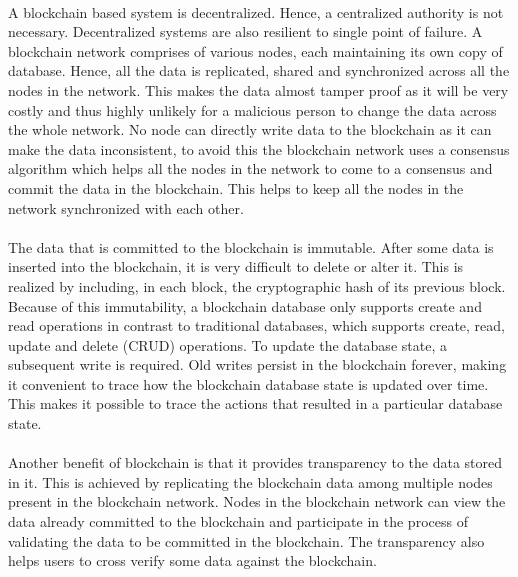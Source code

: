 \documentclass[12pt]{article}
\begin{document}
        \paragraph{}
        A blockchain based system is decentralized. Hence, a centralized authority is not necessary. Decentralized systems are also resilient to single point of failure. A blockchain network comprises of various nodes, each maintaining its own copy of database. Hence, all the data is replicated, shared and synchronized across all the nodes in the network. This makes the data almost tamper proof as it will be very costly and thus highly unlikely for a malicious person to change the data across the whole network. No node can directly write data to the blockchain as it can make the data inconsistent, to avoid this the blockchain network uses a consensus algorithm which helps all the nodes in the network to come to a consensus and commit the data in the blockchain. This helps to keep all the nodes in the network synchronized with each other. 

        \paragraph{}
        The data that is committed to the blockchain is immutable. After some data is inserted into the blockchain, it is very difficult to delete or alter it. This is realized by including, in each block, the cryptographic hash of its previous block. Because of this immutability, a blockchain database only supports create and read operations in contrast to traditional databases, which supports create, read, update and delete (CRUD) operations. To update the database state, a subsequent write is required. Old writes persist in the blockchain forever, making it convenient to trace how the blockchain database state is updated over time. This makes it possible to trace the actions that resulted in a particular database state.

        \paragraph{}
        Another benefit of blockchain is that it provides transparency to the data stored in it. This is achieved by replicating the blockchain data among multiple nodes present in the blockchain network. Nodes in the blockchain network can view the data already committed to the blockchain and participate in the process of validating the data to be committed in the blockchain. The transparency also helps users to cross verify some data against the blockchain.  
\end{document}
